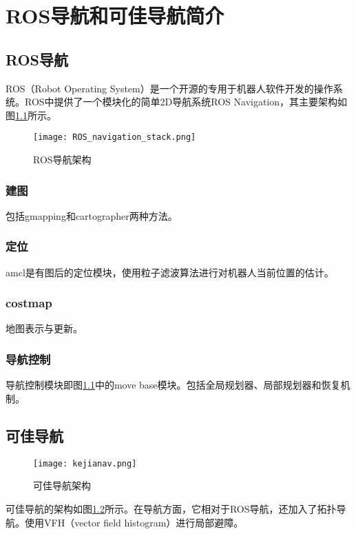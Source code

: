 
\chapter{ROS导航和可佳导航简介}

\section{ROS导航}

ROS（Robot Operating System）是一个开源的专用于机器人软件开发的操作系统。ROS中提供了一个模块化的简单2D导航系统ROS Navigation，其主要架构如图\ref{fig:rosnav}所示。

\begin{figure}[htb]
  \centering
  \texttt{[image: ROS\_navigation\_stack.png]}
  \caption{ROS导航架构}
  \label{fig:rosnav}
\end{figure}

\subsection{建图}
  包括gmapping\cite{grisetti2007improved}和cartographer\cite{hess2016real}两种方法。

\subsection{定位}
  amcl是有图后的定位模块，使用粒子滤波算法进行对机器人当前位置的估计。

\subsection{costmap}

  地图表示与更新。

\subsection{导航控制}

  导航控制模块即图\ref{fig:rosnav}中的move base模块。包括全局规划器、局部规划器和恢复机制。

\section{可佳导航}

\begin{figure}[htb]
  \centering
  \texttt{[image: kejianav.png]}
  \caption{可佳导航架构}
  \label{fig:kejianav}
\end{figure}

  可佳导航的架构如图\ref{fig:kejianav}所示。在导航方面，它相对于ROS导航，还加入了拓扑导航。使用VFH（vector field histogram）\cite{borenstein1991vector}进行局部避障。